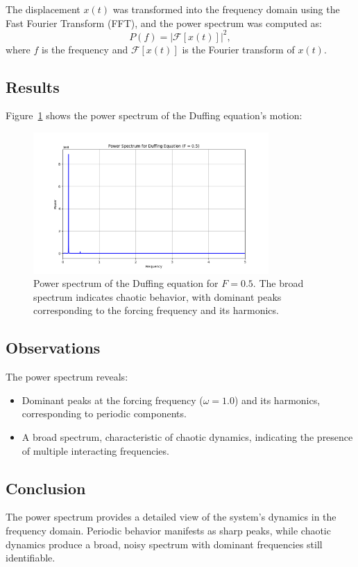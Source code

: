 \documentclass[11pt]{article}
\begin{document}
The displacement \(x(t)\) was transformed into the frequency domain using the Fast Fourier Transform (FFT), and the power spectrum was computed as:
\[
P(f) = |\mathcal{F}[x(t)]|^2,
\]
where \(f\) is the frequency and \(\mathcal{F}[x(t)]\) is the Fourier transform of \(x(t)\).

\subsection*{Results}
Figure~\ref{fig:power_spectrum} shows the power spectrum of the Duffing equation's motion:
\begin{figure}[h!]
    \centering
    \includegraphics[width=0.8\textwidth]{power_spectrum.png}
    \caption{Power spectrum of the Duffing equation for \(F = 0.5\). The broad spectrum indicates chaotic behavior, with dominant peaks corresponding to the forcing frequency and its harmonics.}
    \label{fig:power_spectrum}
\end{figure}

\subsection*{Observations}
The power spectrum reveals:
\begin{itemize}
    \item Dominant peaks at the forcing frequency (\(\omega = 1.0\)) and its harmonics, corresponding to periodic components.
    \item A broad spectrum, characteristic of chaotic dynamics, indicating the presence of multiple interacting frequencies.
\end{itemize}

\subsection*{Conclusion}
The power spectrum provides a detailed view of the system's dynamics in the frequency domain. Periodic behavior manifests as sharp peaks, while chaotic dynamics produce a broad, noisy spectrum with dominant frequencies still identifiable.
\end{document}
